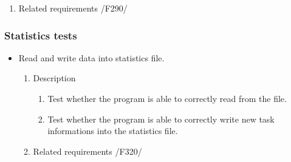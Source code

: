 {\begin{itemize}
\begin{enumerate}
					\item Related requirements\newline
					/F290/
				\end{enumerate}
		\end{itemize}
		\subsubsection{Statistics tests}
		\begin{itemize}
		
		
		
				\item Read and write data into statistics file.
				\begin{enumerate}
					\item Description\newline
					\begin{enumerate}
					
					\item 
Test whether the program is able to correctly read from the file.
					\item
Test whether the program is able to correctly write new task informations into the statistics file.
					\end{enumerate}
					\item Related requirements\newline
					/F320/
					
				\end{enumerate}
				
				
				
				
				

\end{itemize}}
